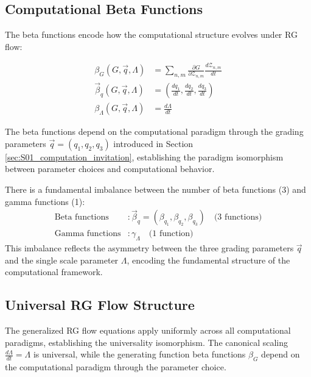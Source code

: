 \subsection{Computational Beta Functions}

\begin{definition}
\label{def:computational-beta-functions}
The beta functions encode how the computational structure evolves under RG flow:

\begin{align}
\beta_G(G, \vec{q}, \Lambda) &= \sum_{n,m} \frac{\partial G}{\partial \mathcal{Z}_{n,m}} \frac{d\mathcal{Z}_{n,m}}{dt} \\
\vec{\beta}_q(G, \vec{q}, \Lambda) &= \left(\frac{dq_1}{dt}, \frac{dq_2}{dt}, \frac{dq_3}{dt}\right) \\
\beta_\Lambda(G, \vec{q}, \Lambda) &= \frac{d\Lambda}{dt}
\end{align}

The beta functions depend on the computational paradigm through the grading parameters $\vec{q} = (q_1, q_2, q_3)$ introduced in Section \ref{sec:S01_computation_invitation}, establishing the paradigm isomorphism between parameter choices and computational behavior.

\begin{remark}
\label{rem:beta-gamma-imbalance}
There is a fundamental imbalance between the number of beta functions (3) and gamma functions (1):
\begin{align}
\text{Beta functions} &: \vec{\beta}_q = (\beta_{q_1}, \beta_{q_2}, \beta_{q_3}) \quad \text{(3 functions)} \\
\text{Gamma functions} &: \gamma_\Lambda \quad \text{(1 function)}
\end{align}
This imbalance reflects the asymmetry between the three grading parameters $\vec{q}$ and the single scale parameter $\Lambda$, encoding the fundamental structure of the computational framework.
\end{remark}
\end{definition}

\subsection{Universal RG Flow Structure}

The generalized RG flow equations apply uniformly across all computational paradigms, establishing the universality isomorphism. The canonical scaling $\frac{d\Lambda}{dt} = \Lambda$ is universal, while the generating function beta functions $\beta_G$ depend on the computational paradigm through the parameter choice.

